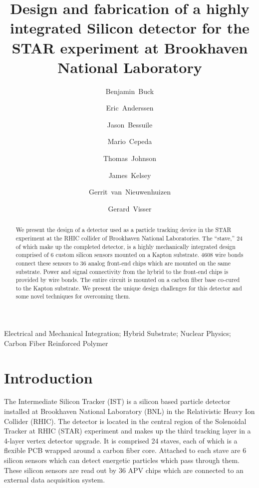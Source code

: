 \documentclass[preprint,12pt]{elsarticle}
\begin{document}
\begin{frontmatter}
\title{Design and fabrication of a highly integrated Silicon detector for the
STAR experiment at Brookhaven National Laboratory}
%
\author[mit]{Benjamin~Buck}
\author[lbl]{Eric~Anderssen}
\author[mit]{Jason~Bessuile}
\author[lbl]{Mario~Cepeda}
\author[lbl]{Thomas~Johnson}
\author[mit]{James~Kelsey}
\author[mit]{Gerrit~van~Nieuwenhuizen}
\author[iu]{Gerard~Visser}
\address[iu]{Indiana University, Bloomington, IN, USA}
\address[lbl]{Lawrence Berkeley National Laboratory, Berkeley, CA, USA}
\address[mit]{Massachusetts Institute of Technology, Cambridge, MA, USA}
%
%
\begin{abstract}
We present the design of a detector used as a particle tracking device in the
STAR experiment at the RHIC collider of Brookhaven National Laboratories. The
``stave,'' 24 of which make up the completed detector, is a highly mechanically
integrated design comprised of 6 custom silicon sensors mounted on a Kapton
substrate. 4608 wire bonds connect these sensors to 36 analog front-end chips
which are mounted on the same substrate. Power and signal connectivity from the
hybrid to the front-end chips is provided by wire bonds. The entire circuit is
mounted on a carbon fiber base co-cured to the Kapton substrate. We present the
unique design challenges for this detector and some novel techniques for
overcoming them.
\end{abstract}
\begin{keyword}
Electrical and Mechanical Integration; Hybrid Substrate; Nuclear Physics; Carbon
Fiber Reinforced Polymer
\end{keyword}
\end{frontmatter}
%
\section{Introduction}
The Intermediate Silicon Tracker (IST) is a silicon based particle detector
installed at Brookhaven National Laboratory (BNL) in the Relativistic Heavy Ion
Collider (RHIC). The detector is located in the central region of the
Solenoidal Tracker at RHIC (STAR) experiment
and makes up the third tracking layer in a 4-layer vertex detector
upgrade. It is comprised 24 staves, each of which is a flexible PCB wrapped
around a carbon fiber core. Attached to each stave are 6 silicon sensors which
can detect energetic particles which pass through them. These silicon sensors are read
out by 36 APV chips which are connected to an external data acquisition system.
\end{document}
